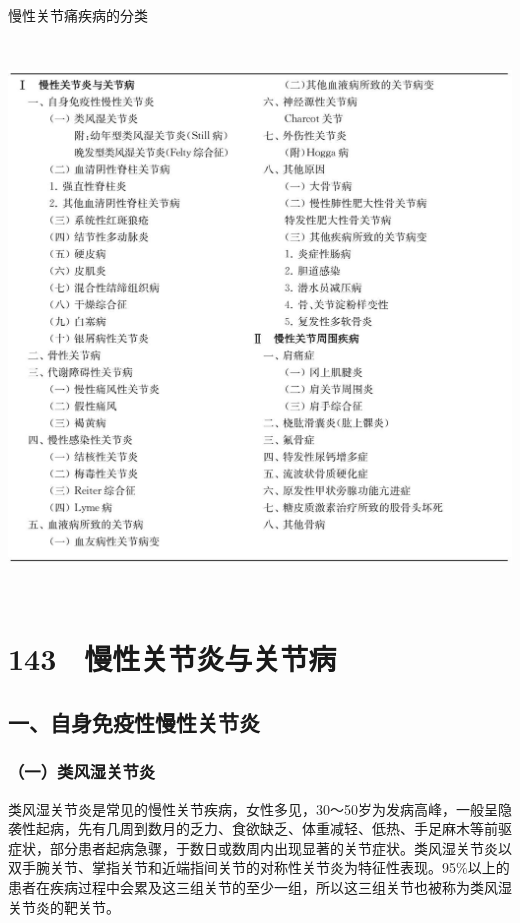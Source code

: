 \begin{table}[htbp]
\centering
\caption{慢性关节痛疾病的分类}
\label{tab43-1}
\includegraphics[width=5.89583in,height=5.79167in]{./images/Image00256.jpg}
\end{table}

\protect\hypertarget{text00329.html}{}{}

\section{143　慢性关节炎与关节病}

\subsection{一、自身免疫性慢性关节炎}

\subsubsection{（一）类风湿关节炎}

类风湿关节炎是常见的慢性关节疾病，女性多见，30～50岁为发病高峰，一般呈隐袭性起病，先有几周到数月的乏力、食欲缺乏、体重减轻、低热、手足麻木等前驱症状，部分患者起病急骤，于数日或数周内出现显著的关节症状。类风湿关节炎以双手腕关节、掌指关节和近端指间关节的对称性关节炎为特征性表现。95\%以上的患者在疾病过程中会累及这三组关节的至少一组，所以这三组关节也被称为类风湿关节炎的靶关节。

